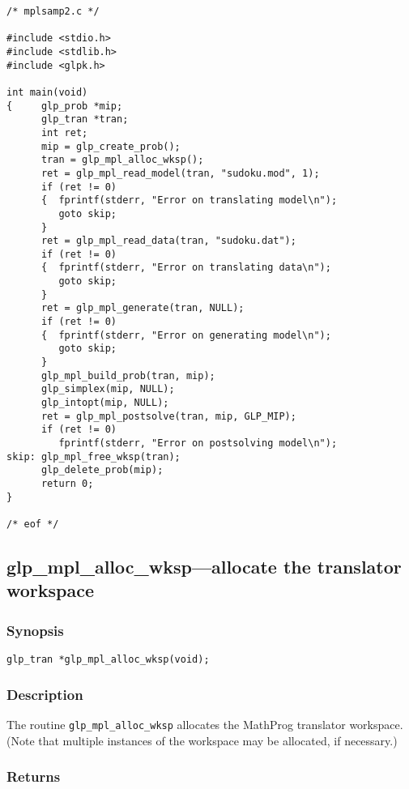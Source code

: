 \begin{small}
\begin{verbatim}
/* mplsamp2.c */

#include <stdio.h>
#include <stdlib.h>
#include <glpk.h>

int main(void)
{     glp_prob *mip;
      glp_tran *tran;
      int ret;
      mip = glp_create_prob();
      tran = glp_mpl_alloc_wksp();
      ret = glp_mpl_read_model(tran, "sudoku.mod", 1);
      if (ret != 0)
      {  fprintf(stderr, "Error on translating model\n");
         goto skip;
      }
      ret = glp_mpl_read_data(tran, "sudoku.dat");
      if (ret != 0)
      {  fprintf(stderr, "Error on translating data\n");
         goto skip;
      }
      ret = glp_mpl_generate(tran, NULL);
      if (ret != 0)
      {  fprintf(stderr, "Error on generating model\n");
         goto skip;
      }
      glp_mpl_build_prob(tran, mip);
      glp_simplex(mip, NULL);
      glp_intopt(mip, NULL);
      ret = glp_mpl_postsolve(tran, mip, GLP_MIP);
      if (ret != 0)
         fprintf(stderr, "Error on postsolving model\n");
skip: glp_mpl_free_wksp(tran);
      glp_delete_prob(mip);
      return 0;
}

/* eof */
\end{verbatim}
\end{small}

\subsection{glp\_mpl\_alloc\_wksp---allocate the translator workspace}

\subsubsection*{Synopsis}

\begin{verbatim}
glp_tran *glp_mpl_alloc_wksp(void);
\end{verbatim}

\subsubsection*{Description}

The routine \verb|glp_mpl_alloc_wksp| allocates the MathProg translator
work\-space. (Note that multiple instances of the workspace may be
allocated, if necessary.)

\subsubsection*{Returns}

